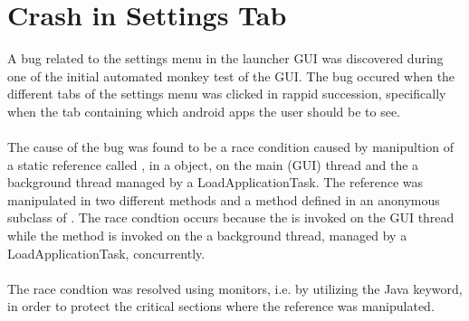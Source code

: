 \section{Crash in Settings Tab}
\label{sec:crash_in_settings_tab}

A bug related to the settings menu in the launcher GUI was discovered during one of the initial automated monkey test of the GUI. The bug occured when the different tabs of the settings menu was clicked in rappid succession, specifically when the tab containing which android apps the user should be to see.
\\\\
The cause of the bug was found to be a race condition caused by manipultion of a static reference called , in a  object, on the main (GUI) thread and the a background thread managed by a LoadApplicationTask. The reference was manipulated in two different methods  and a method  defined in an anonymous subclass of . The race condtion occurs because the  is invoked on the GUI thread while the  method is invoked on the a background thread, managed by a LoadApplicationTask, concurrently.   
\\\\
The race condtion was resolved using monitors, i.e. by utilizing the  Java keyword, in order to protect the critical sections where the  reference was manipulated.




